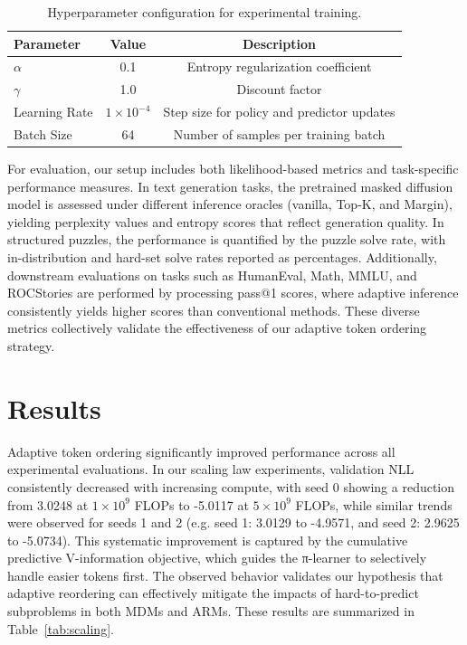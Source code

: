 \documentclass{article}
\begin{document}
\begin{table}[h]
\centering
\begin{tabular}{lcc}
\hline
Parameter       & Value               & Description\\
\hline
\( \alpha \)    & 0.1                 & Entropy regularization coefficient\\
\( \gamma \)    & 1.0                 & Discount factor\\
Learning Rate   & \(1\times10^{-4}\)  & Step size for policy and predictor updates\\
Batch Size      & 64                  & Number of samples per training batch\\
\hline
\end{tabular}
\caption{Hyperparameter configuration for experimental training.}
\label{tab:exp_hyper}
\end{table}

For evaluation, our setup includes both likelihood-based metrics and task-specific performance measures. In text generation tasks, the pretrained masked diffusion model is assessed under different inference oracles (vanilla, Top-K, and Margin), yielding perplexity values and entropy scores that reflect generation quality. In structured puzzles, the performance is quantified by the puzzle solve rate, with in-distribution and hard-set solve rates reported as percentages. Additionally, downstream evaluations on tasks such as HumanEval, Math, MMLU, and ROCStories are performed by processing pass@1 scores, where adaptive inference consistently yields higher scores than conventional methods. These diverse metrics collectively validate the effectiveness of our adaptive token ordering strategy.

\section{Results}
Adaptive token ordering significantly improved performance across all experimental evaluations. In our scaling law experiments, validation NLL consistently decreased with increasing compute, with seed 0 showing a reduction from 3.0248 at \(1 \times 10^9\) FLOPs to -5.0117 at \(5 \times 10^9\) FLOPs, while similar trends were observed for seeds 1 and 2 (e.g. seed 1: 3.0129 to -4.9571, and seed 2: 2.9625 to -5.0734). This systematic improvement is captured by the cumulative predictive V-information objective, which guides the π-learner to selectively handle easier tokens first. The observed behavior validates our hypothesis that adaptive reordering can effectively mitigate the impacts of hard-to-predict subproblems in both MDMs and ARMs. These results are summarized in Table~\ref{tab:scaling}.
\end{document}
